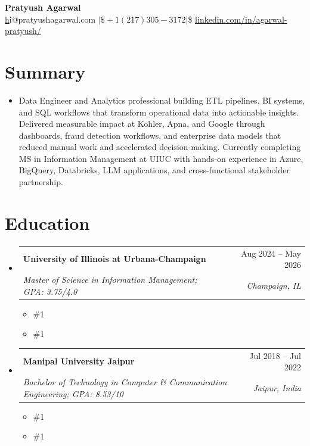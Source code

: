 \documentclass[letterpaper,11pt]{article}
\makeatletter
\newcommand{\resumeSubheading}[4]{
  \vspace{0pt}\item
    \begin{tabular*}{\textwidth}{l@{\extracolsep{\fill}}r}
      \textbf{#1} & #2 \\
      \textit{#3} & \textit{#4} \\ 
    \end{tabular*}\vspace{-6pt}
}
\newcommand{\resumeEducationCoursework}[1]{
  \vspace{-9pt} 
  \begin{itemize}[leftmargin=0pt, label={}]
    \item {\#1}
  \end{itemize}
}
\newcommand{\resumeEducationCertifications}[1]{
  \vspace{-15pt} 
  \begin{itemize}[leftmargin=0pt, label={}]
    \item {\#1}
  \end{itemize}
}
\newcommand{\resumeSubHeadingListStart}{\begin{itemize}[leftmargin=0pt,label={},itemsep=-2pt]}
\newcommand{\resumeSubHeadingListEnd}{\end{itemize}}
\makeatother
\begin{document}
\justifying

\begin{center}
    \textbf{\LARGE Pratyush Agarwal} \\ \vspace{5pt}
    \href{mailto:hi@pratyushagarwal.com}hi@pratyushagarwal.com $|\$ +1 (217) 305-3172 $|\$ \href{%
      https://linkedin.com/in/agarwal-pratyush/%
    }{%
      linkedin.com/in/agarwal-pratyush/%
    }
\end{center}

\section{Summary}
\begin{itemize}[leftmargin=0pt, label={}]
  \item { Data Engineer and Analytics professional building ETL pipelines, BI systems, and SQL workflows that transform operational data into actionable insights. Delivered measurable impact at Kohler, Apna, and Google through dashboards, fraud detection workflows, and enterprise data models that reduced manual work and accelerated decision-making. Currently completing MS in Information Management at UIUC with hands-on experience in Azure, BigQuery, Databricks, LLM applications, and cross-functional stakeholder partnership. }
\end{itemize}

\section{Education}
  \resumeSubHeadingListStart
    \resumeSubheading
      {University of Illinois at Urbana-Champaign}{Aug 2024 -- May 2026}
      {Master of Science in Information Management; GPA: 3.75/4.0}{Champaign, IL}
      \resumeEducationCoursework{Relevant Coursework: Applied Machine Learning, Cloud Computing Applications, Data Mining, Data Warehousing \& Business Intelligence, Information Modeling, Data Visualization}
      \resumeEducationCertifications{Certifications: Microsoft Azure Fundamentals, Cloud Computing, Complete Prompt Engineering for AI}

    \resumeSubheading
      {Manipal University Jaipur}{Jul 2018 -- Jul 2022}
      {Bachelor of Technology in Computer \& Communication Engineering; GPA: 8.53/10}{Jaipur, India}
      \resumeEducationCoursework{Relevant Coursework: Data Structures \& Algorithms, Database Management Systems, Operating Systems, Computer Networks}
      \resumeEducationCertifications{Certifications: Google Project Management, Networking in Google Cloud, Architecting with Google Kubernetes Engine}
  \resumeSubHeadingListEnd
\end{document}
